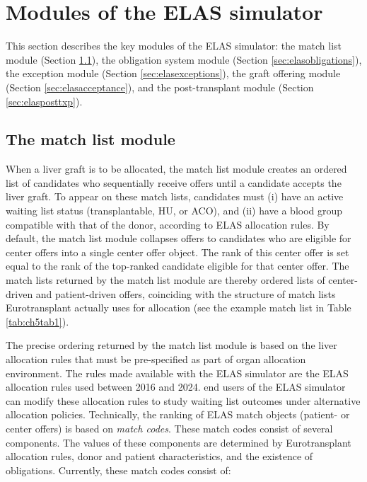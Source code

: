 \documentclass[11pt,twoside,]{book}
\begin{document}
\section{Modules of the ELAS simulator}\label{sec:elasmodules}

This section describes the key modules of the ELAS simulator: the match list
module (Section \ref{sec:elasmatchlist}), the obligation system module (Section
\ref{sec:elasobligations}), the exception module (Section \ref{sec:elasexceptions}),
the graft offering module (Section \ref{sec:elasacceptance}), and the post-transplant module
(Section \ref{sec:elasposttxp}).

\FloatBarrier

\subsection{The match list module}\label{sec:elasmatchlist}

When a liver graft is to be allocated, the match list
module creates an ordered list of candidates who sequentially receive
offers until a candidate accepts the liver
graft. To appear on these match lists, candidates must (i) have an active
waiting list status (transplantable, HU, or ACO), and (ii) have a blood
group compatible with that of the donor, according to ELAS
allocation rules. By default, the match list module collapses offers to
candidates who are eligible for center offers into a single center offer object.
The rank of this center offer is set equal to the rank of the top-ranked candidate
eligible for that center offer. The match lists returned by the match list module
are thereby ordered lists of center-driven and patient-driven offers,
coinciding with the structure of match lists Eurotransplant actually uses
for allocation (see the example match list in Table \ref{tab:ch5tab1}).

The precise ordering returned by the match list module is based on the liver
allocation rules that must be pre-specified as part of organ
allocation environment. The rules made available with the ELAS simulator
are the ELAS allocation rules used between 2016 and 2024. end users of the
ELAS simulator can modify these allocation rules to study waiting list outcomes under
alternative allocation policies. Technically, the ranking of ELAS match objects (patient- or
center offers) is based on \emph{match codes}. These match codes
consist of several components. The values of these components are determined
by Eurotransplant allocation rules, donor and patient characteristics,
and the existence of obligations. Currently, these match codes consist of:
\end{document}

